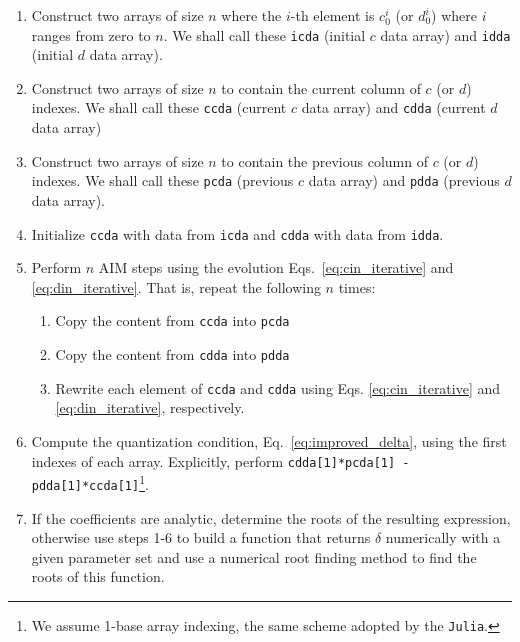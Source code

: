 \begin{enumerate}
  \item Construct two arrays of size $n$ where the $i$-th element is $c^i_0$ (or $d^i_0$) where $i$ ranges from zero to $n$. We shall call these \texttt{icda} (initial $c$ data array) and \texttt{idda} (initial $d$ data array).

  \item Construct two arrays of size $n$ to contain the current column of $c$ (or $d$) indexes. We shall call these \texttt{ccda} (current $c$ data array) and \texttt{cdda} (current $d$ data array)

  \item Construct two arrays of size $n$ to contain the previous column of $c$ (or $d$) indexes. We shall call these \texttt{pcda} (previous $c$ data array) and \texttt{pdda} (previous $d$ data array).

  \item Initialize \texttt{ccda} with data from \texttt{icda} and \texttt{cdda} with data from \texttt{idda}.

  \item Perform $n$ \ac{AIM} steps using the evolution Eqs.~\eqref{eq:cin_iterative} and \eqref{eq:din_iterative}. That is, repeat the following $n$ times:
        \begin{enumerate}
          \item Copy the content from \texttt{ccda} into \texttt{pcda}
          \item Copy the content from \texttt{cdda} into \texttt{pdda}
          \item Rewrite each element of \texttt{ccda} and \texttt{cdda} using Eqs. \eqref{eq:cin_iterative} and \eqref{eq:din_iterative}, respectively.
        \end{enumerate}

  \item Compute the quantization condition, Eq.~\eqref{eq:improved_delta}, using the first indexes of each array. Explicitly, perform \texttt{cdda[1]*pcda[1] - pdda[1]*ccda[1]}\footnote{We assume 1-base array indexing, the same scheme adopted by the \texttt{Julia}.}.

  \item If the coefficients are analytic, determine the roots of the resulting expression, otherwise use steps 1-6 to build a function that returns $\delta$ numerically with a given parameter set and use a numerical root finding method to find the roots of this function.
\end{enumerate}
